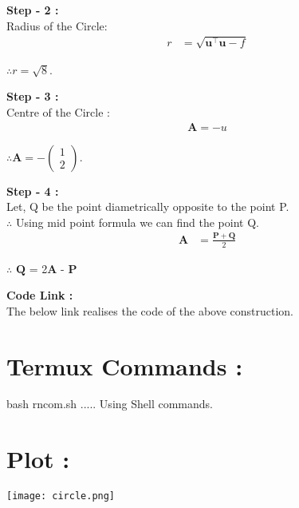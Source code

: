 \documentclass[10pt,a4paper]{report}
\newcommand{\myvec}[1]{\ensuremath{\begin{pmatrix}#1\end{pmatrix}}}
\let\vec\mathbf
\begin{document}
\begin{multicols}{2}
\raggedright \textbf{Step - 2 :}\\ \vspace{2mm}
Radius of the Circle:
	\begin{align}
	r &=\sqrt{{\vec{u}^{\top}\vec{u}}-f }
    \end{align}
    \begin{center}
    $\therefore r = \sqrt{8}$.
    \end{center}

\raggedright \textbf{Step - 3 :}\\ \vspace{2mm}
Centre of the Circle :
\begin{align}
\vec{A}=-u
\end{align}
\begin{center}
$\therefore\vec{A} =- \myvec{1 \\2}$.
\end{center}

\raggedright \textbf{Step - 4 :}\\ \vspace{2mm}
Let, Q be the point diametrically opposite to the point P.\\ \vspace{1mm}
$\therefore$ Using mid point formula we can find the point Q.
\begin{align}
	\vec{A} &= \frac{\vec{P}+\vec{Q}}{2}
\end{align}
\begin{center}
	$\therefore$ $\vec{Q}$ = 2$\vec{A}$ - $\vec{P}$
\end{center}

\raggedright \textbf{Code Link :}\\ \vspace{2mm}
The below link realises the code of the above construction.\\
\begin{center}
\end{center}

\section{Termux Commands :}
\centering bash rncom.sh ..... Using Shell commands.

\section{Plot :}
\begin{center}
  \texttt{[image: circle.png]}
  	\end{center}

\end{multicols}
\end{document}
